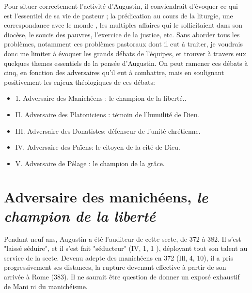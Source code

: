 Pour situer correctement l'activité d'Augustin, il conviendrait d'évoquer ce qui est l'essentiel de sa vie de pasteur ; la prédication au cours de la liturgie, une correspondance avec le monde , les  multiples affaires qui le sollicitaient dans son diocèse, le soucis des pauvres, l'exercice de la justice, etc.  Sans aborder tous les problèmes, notamment ces problèmes pastoraux dont il eut à traiter, je voudrais 
donc me limiter à évoquer les grands débats de l'équipes, et trouver à travers eux quelques themes essentiels de la pensée d'Augustin. On peut  ramener ces débats à cinq, en  fonction  des adversaires  qu'il  eut  à  combattre,  mais en soulignant positivement les enjeux théologiques de ces débats:
\begin{itemize}
    \item 1. Adversaire des Manichéens : le champion de la liberté..
\item II. Adversaire des Platoniciens : témoin de l'humilité de Dieu.
\item III. Adversaire des Donatistes: défenseur de l'unité chrétienne.
\item IV.	Adversaire des Païens: le citoyen de la cité de Dieu.
\item  V.	Adversaire de Pélage : le champion de la grâce.
\end{itemize}


\section{Adversaire des manichéens, \textit{le champion de la liberté}}
 


Pendant neuf ans, Augustin a été l'auditeur de cette secte, de 372 à 382. Il s'est "laissé séduire", et il s'est fait "séducteur" (IV, 1, 1 ), déployant tout son talent au service de la secte. Devenu adepte des manichéens en 372 (Ill, 4, 10), il a pris progressivement ses distances, la rupture devenant effective à partir de son arrivée à Rome (383). Il ne saurait être question de donner un exposé exhaustif de Mani ni du manichéisme. 

